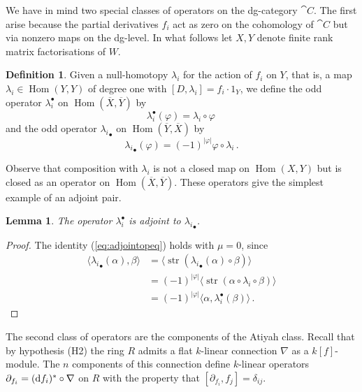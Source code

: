 \documentclass{compositio}
\newtheorem{lemma}[theorem]{Lemma}
\theoremstyle{definition}
\newtheorem{definition}[theorem]{Definition}
\numberwithin{equation}{section}
\def\Hom{\operatorname{Hom}}
\DeclareMathOperator{\str}{str}
\begin{document}
We have in mind two special classes of operators on the dg-category $\cat{C}$. The first arise because the partial derivatives $f_i$ act as zero on the cohomology of $\cat{C}$ but via nonzero maps on the dg-level. In what follows let $X,Y$ denote finite rank matrix factorisations of $W$.

\begin{definition} Given a null-homotopy $\lambda_i$ for the action of $f_i$ on $Y$, that is, a map $\lambda_i \in \Hom(Y,Y)$ of degree one with $[D, \lambda_i] = f_i \cdot 1_Y$, we define the odd operator $\lambda_i^\bullet$ on $\Hom(\overline{X},\overline{Y})$ by
\[
\lambda_i^\bullet(\varphi) = \lambda_i \circ \varphi\,
\]
and the odd operator ${\lambda_i}_\bullet$ on $\Hom(\overline{Y}, \overline{X})$ by
\[
{\lambda_i}_\bullet(\varphi) = (-1)^{|\varphi|} \varphi \circ \lambda_i \,.
\]
\end{definition}

Observe that composition with $\lambda_i$ is not a closed map on $\Hom(X,Y)$ but is closed as an operator on $\Hom(\overline{X}, \overline{Y})$. These operators give the simplest example of an adjoint pair.

\begin{lemma} The operator $\lambda_i^\bullet$ is adjoint to ${\lambda_i}_\bullet$.
\end{lemma}
\begin{proof}
The identity (\ref{eq:adjointopeq}) holds with $\mu = 0$, since
\begin{align*}
\langle {\lambda_i}_\bullet(\alpha), \beta \rangle &= \langle \str( {\lambda_i}_\bullet(\alpha) \circ \beta ) \rangle\\
&= (-1)^{|\varphi|} \langle \str( \alpha \circ \lambda_i \circ \beta ) \rangle\\
&= (-1)^{|\varphi|} \langle \alpha, \lambda_i^\bullet(\beta) \rangle\,.
\end{align*}
\end{proof}

The second class of operators are the components of the Atiyah class. Recall that by hypothesis (H2) the ring $R$ admits a flat $k$-linear connection $\nabla$ as a $k[f]$-module. The $n$ components of this connection define $k$-linear operators $\partial_{f_i} = (\mathrm{d} f_i)^* \circ \nabla$ on $R$ with the property that $[\partial_{f_i}, f_j] = \delta_{ij}$.
\end{document}
